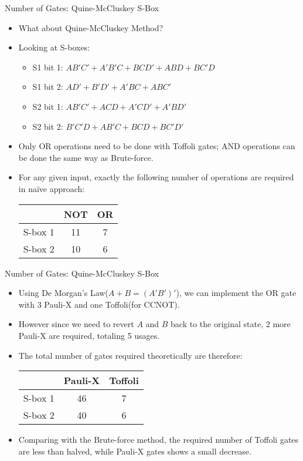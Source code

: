 \documentclass{beamer}
\begin{document}
	\begin{frame}{Number of Gates: Quine-McCluskey S-Box}
		\begin{itemize}
			\item What about Quine-McCluskey Method?
			\item Looking at S-boxes:
			\begin{itemize}
				\item S1 bit 1: $AB'C'+A'B'C+BCD'+ABD+BC'D$
				\item S1 bit 2: $AD'+B'D'+A'BC+ABC'$
				\item S2 bit 1: $AB'C'+ACD+A'CD'+A'BD'$
				\item S2 bit 2: $B'C'D+AB'C+BCD+BC'D'$
			\end{itemize}
			\item Only OR operations need to be done with Toffoli gates; AND operations can be done the same way as Brute-force.
			\item For any given input, exactly the following number of operations are required in naïve approach:
			\begin{center}
				\begin{tabular}{c|c|c}
					& NOT & OR \\\hline
					S-box 1 & 11      & 7      \\\hline
					S-box 2 & 10      & 6
				\end{tabular}
			\end{center}
		\end{itemize}
	\end{frame}
	
	\begin{frame}{Number of Gates: Quine-McCluskey S-Box}
		\begin{itemize}
			\item Using De Morgan's Law($A+B=(A'B')'$), we can implement the OR gate with 3 Pauli-X and one Toffoli(for CCNOT).
			\item However since we need to revert $A$ and $B$ back to the original state, 2 more Pauli-X are required, totaling 5 usages.
			\item The total number of gates required theoretically are therefore:
			\begin{center}
				\begin{tabular}{c|c|c}
					& Pauli-X & Toffoli \\\hline
					S-box 1 & 46      & 7      \\\hline
					S-box 2 & 40      & 6
				\end{tabular}
			\end{center}
			\item Comparing with the Brute-force method, the required number of Toffoli gates are less than halved, while Pauli-X gates shows a small decrease.
		\end{itemize}
	\end{frame}
	
\end{document}
